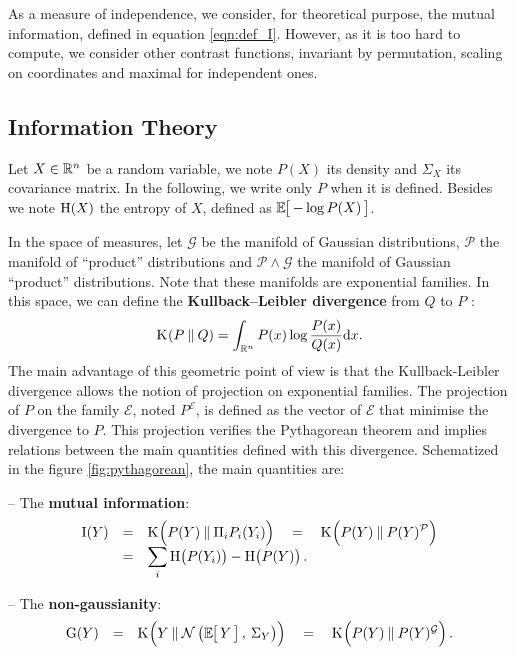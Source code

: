 \documentclass[a4paper]{article}
\newcommand{\Kl}[3][]{\mathrm K_{#1}\!\zp{#2\:\|\:#3}}
\newcommand{\zZ}[2]{\mathrm #1\!\zp{#2}}
\newcommand{\zD}{\mathcal}
\newcommand{\Ng}[2]{\mathcal{N}\zp{#1,\:#2}}
\newcommand{\zmev}[1]{\textbf{#1}}
\begin{document}
As a measure of independence, we consider, for theoretical purpose,
the mutual information, defined in equation \ref{eqn:def_I}.
However, as it is too hard to compute, we consider other contrast functions, invariant by permutation, scaling on coordinates and maximal for independent ones.



\subsection{Information Theory}
\label{infth}
Let $X\in\mathbb{R}^n$ be a random variable, we note $P(X)$ its density and $\Sigma_X$ its covariance matrix. In the following, we write only $P$ when it is defined. Besides we note $\zZ HX$ the entropy of $X$, defined as $\zesp{-\log P(X)}$.

\znl

In the space of measures, let $\zD G$ be the manifold of Gaussian distributions, $\zD P$ the manifold of ``product'' distributions and $\zD P\wedge\zD G$ the manifold of Gaussian ``product'' distributions. Note that these manifolds are exponential families.
In this space, we can define the \zmev{Kullback--Leibler divergence} from $Q$ to $P$ :
\begin{equation}
  \Kl PQ = \int_{\zR^n} P(x) \log\frac{P(x)}{Q(x)} \zdx x.
\end{equation}
The main advantage of this geometric point of view is that the Kullback-Leibler divergence allows the notion of projection on exponential families.
The projection of $P$ on the family $\zD E$, noted $P^{\zD E}$, is defined as the vector of $\zD E$ that minimise the divergence to $P$.
This projection verifies the Pythagorean theorem and implies relations between the main quantities defined with this divergence.
Schematized in the figure \ref{fig:pythagorean}, the main quantities are:

-- The \zmev{mutual information}:
\begin{equation}\label{eqn:def_I}\begin{array}{rcl}
  \zZ IY &=&\displaystyle \Kl {\zpbig2 P(Y)}{\Pi_i P_i(Y_i)} \quad=\quad \Kl {\zpbig2 P(Y)}{P(Y)^{\zD P}}\\
&=&\displaystyle \sum_i \zZ H{\zpbig1P(Y_i)} - \zZ H{\zpbig1P(Y)}.
\end{array}\end{equation}

-- The \zmev{non-gaussianity}:
\begin{equation}\begin{array}{rcl}
  \zZ GY &=& \Kl{Y}{\Ng{\zesp Y}{\Sigma_Y}\zpbig2} \quad=\quad \Kl {\zpbig2 P(Y)}{P(Y)^{\zD G}}.
\end{array}\end{equation}
\end{document}
